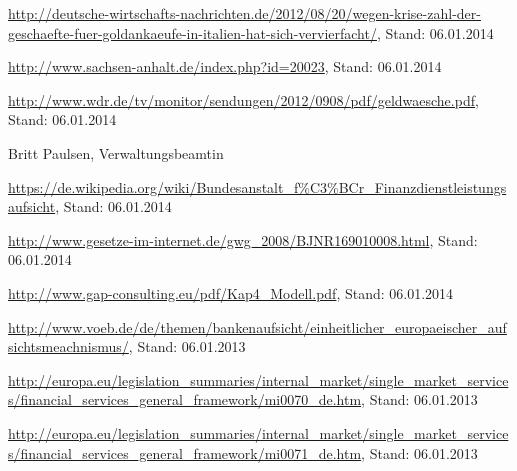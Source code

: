 \documentclass{article}
\begin{document}
\newpage

    \begin{thebibliography}{9}

         \url{http://deutsche-wirtschafts-nachrichten.de/2012/08/20/wegen-krise-zahl-der-geschaefte-fuer-goldankaeufe-in-italien-hat-sich-vervierfacht/}, Stand: 06.01.2014

         \url{http://www.sachsen-anhalt.de/index.php?id=20023}, Stand: 06.01.2014

         \url{http://www.wdr.de/tv/monitor/sendungen/2012/0908/pdf/geldwaesche.pdf}, Stand: 06.01.2014

         Britt Paulsen, Verwaltungsbeamtin

         \url{https://de.wikipedia.org/wiki/Bundesanstalt_f%C3%BCr_Finanzdienstleistungsaufsicht}, Stand: 06.01.2014

         \url{http://www.gesetze-im-internet.de/gwg_2008/BJNR169010008.html}, Stand: 06.01.2014

         \url{http://www.gap-consulting.eu/pdf/Kap4_Modell.pdf}, Stand: 06.01.2014

         \url{http://www.voeb.de/de/themen/bankenaufsicht/einheitlicher_europaeischer_aufsichtsmeachnismus/}, Stand: 06.01.2013

         \url{http://europa.eu/legislation_summaries/internal_market/single_market_services/financial_services_general_framework/mi0070_de.htm}, Stand: 06.01.2013

         \url{http://europa.eu/legislation_summaries/internal_market/single_market_services/financial_services_general_framework/mi0071_de.htm}, Stand: 06.01.2013
        
        
    \end{thebibliography}
\end{document}
